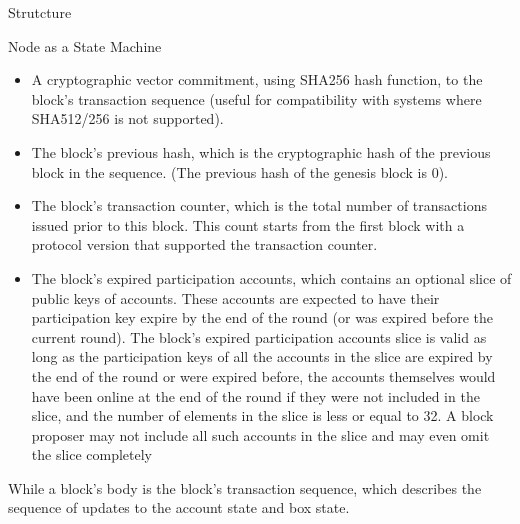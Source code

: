 \documentclass[10pt,a4paper]{article}
\begin{document}
\begin{section}{Strutcture}
\begin{subsection}{Node as a State Machine}
\begin{itemize}
    \item
    A cryptographic vector commitment, using SHA256 hash function, to the block's
    transaction sequence (useful for compatibility with systems where SHA512/256 
    is not supported).
    
    \item
    The block's previous hash, which is the cryptographic hash of the previous
    block in the sequence. (The previous hash of the genesis block is 0).
    
    \item
    The block's transaction counter, which is the total number of transactions
    issued prior to this block. This count starts from the first block with a
    protocol version that supported the transaction counter.
    
    \item
    The block's expired participation accounts, which contains an optional slice
    of public keys of accounts. These accounts are expected to have their
    participation key expire by the end of the round (or was expired before
    the current round).
    The block's expired participation accounts slice is valid as long as the participation keys 
    of all the accounts in the slice are expired by the end of the round or
    were expired before, the accounts themselves would have been online at the end
    of the round if they were not included in the slice, and the number of elements
    in the slice is less or equal to 32. A block proposer may not include all such
    accounts in the slice and may even omit the slice completely
\end{itemize}
While a block's body is the block's transaction sequence, which describes the sequence
of updates to the account state and box state.
%



\end{subsection}
\end{section}
\end{document}
